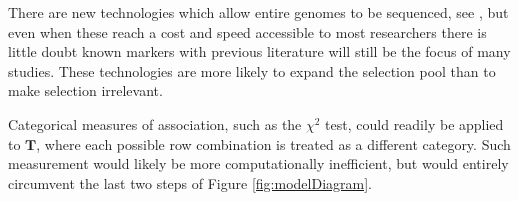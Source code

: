 \documentclass{article}
\newcommand{\m}[1]{\mathbf{#1}}               %
\begin{document}
There are new technologies which allow entire genomes to be sequenced, see \cite{heatherchain2016sequencers, hasinetal2017multi, uffelmannetal2021gwas}, but even when these reach a cost and speed accessible to most researchers there is little doubt known markers with previous literature will still be the focus of many studies. These technologies are more likely to expand the selection pool than to make selection irrelevant.

Categorical measures of association, such as the $\chi^2$ test, could readily be applied to $\m{T}$, where each possible row combination is treated as a different category. Such measurement would likely be more computationally inefficient, but would entirely circumvent the last two steps of Figure \ref{fig:modelDiagram}. 



\renewcommand*{\bibname}{References} %

\end{document}
